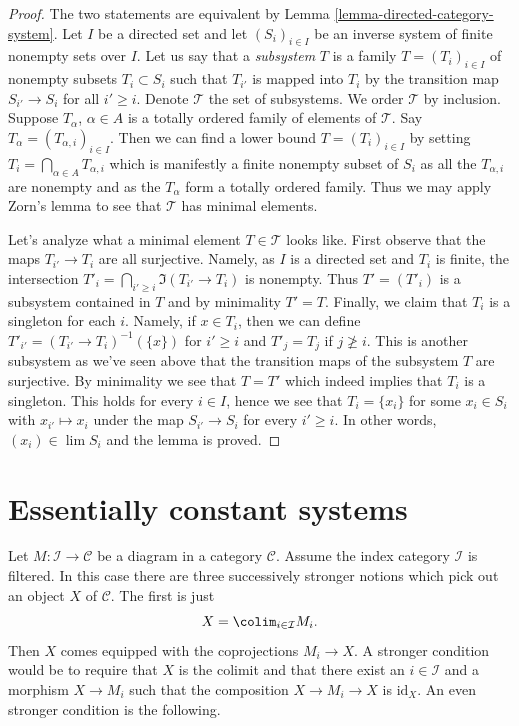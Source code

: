 \begin{proof}
The two statements are equivalent by
Lemma \ref{lemma-directed-category-system}.
Let $I$ be a directed set and let $(S_i)_{i \in I}$
be an inverse system of finite nonempty sets over $I$.
Let us say that a {\it subsystem} $T$ is a family $T = (T_i)_{i \in I}$
of nonempty subsets $T_i \subset S_i$ such that $T_{i'}$ is mapped
into $T_i$ by the transition map $S_{i'} \to S_i$ for all $i' \geq i$.
Denote $\mathcal{T}$ the set of subsystems. We order $\mathcal{T}$
by inclusion. Suppose $T_\alpha$, $\alpha \in A$ is a totally ordered family
of elements of $\mathcal{T}$. Say $T_\alpha = (T_{\alpha, i})_{i \in I}$.
Then we can find a lower bound $T = (T_i)_{i \in I}$ by setting
$T_i = \bigcap_{\alpha \in A} T_{\alpha, i}$ which is manifestly a
finite nonempty subset of $S_i$ as all the $T_{\alpha, i}$ are nonempty
and as the $T_\alpha$ form a totally ordered family. Thus we may
apply Zorn's lemma to see that $\mathcal{T}$ has minimal elements.

\medskip\noindent
Let's analyze what a minimal element $T \in \mathcal{T}$ looks like.
First observe that the maps $T_{i'} \to T_i$ are all surjective.
Namely, as $I$ is a directed set and $T_i$ is finite,
the intersection $T'_i = \bigcap_{i' \geq i} \Im(T_{i'} \to T_i)$
is nonempty. Thus $T' = (T'_i)$ is a subsystem contained in $T$ and
by minimality $T' = T$. Finally, we claim that $T_i$ is a singleton
for each $i$. Namely, if $x \in T_i$, then we can define
$T'_{i'} = (T_{i'} \to T_i)^{-1}(\{x\})$ for $i' \geq i$ and
$T'_j = T_j$ if $j \not \geq i$. This is another subsystem as we've seen
above that the transition maps of the subsystem $T$ are surjective.
By minimality we see that $T = T'$ which indeed implies that $T_i$
is a singleton. This holds for every $i \in I$, hence we see that
$T_i = \{x_i\}$ for some $x_i \in S_i$ with $x_{i'} \mapsto x_i$
under the map $S_{i'} \to S_i$ for every $i' \geq i$. In other words,
$(x_i) \in \lim S_i$ and the lemma is proved.
\end{proof}






\section{Essentially constant systems}
\label{section-essentially-constant}

\noindent
Let $M : \mathcal{I} \to \mathcal{C}$ be a diagram in a category $\mathcal{C}$.
Assume the index category $\mathcal{I}$ is filtered. In this case
there are three successively stronger notions which pick out an object
$X$ of $\mathcal{C}$. The first is just
$$
X = \colim_{i \in \mathcal{I}} M_i.
$$
Then $X$ comes equipped with the coprojections $M_i \to X$.
A stronger condition would be to require that $X$ is the colimit and
that there exist an $i \in \mathcal{I}$ and a morphism $X \to M_i$ such
that the composition $X \to M_i \to X$ is $\text{id}_X$. An even
stronger condition is the following.


